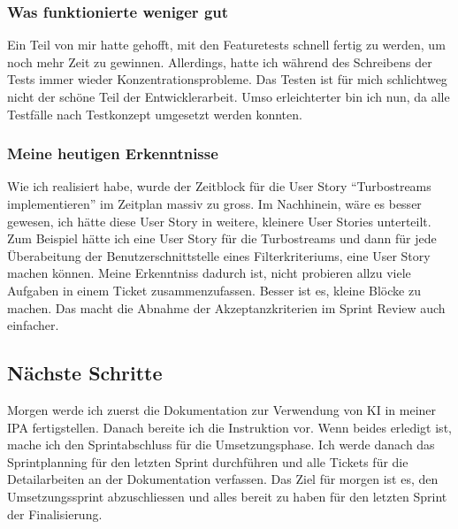 \subsubsection*{Was funktionierte weniger gut}
Ein Teil von mir hatte gehofft, mit den Featuretests schnell fertig zu werden, um noch mehr Zeit zu gewinnen. Allerdings, hatte ich während des Schreibens der Tests
immer wieder Konzentrationsprobleme. Das Testen ist für mich schlichtweg nicht der schöne Teil der Entwicklerarbeit. Umso erleichterter bin ich nun, 
da alle Testfälle nach Testkonzept umgesetzt werden konnten. 

\subsubsection*{Meine heutigen Erkenntnisse}
Wie ich realisiert habe, wurde der Zeitblock für die User Story ``Turbostreams implementieren'' im Zeitplan massiv zu gross. Im Nachhinein, wäre es 
besser gewesen, ich hätte diese User Story in weitere, kleinere User Stories unterteilt. Zum Beispiel hätte ich 
eine User Story für die Turbostreams und dann für jede Überabeitung der Benutzerschnittstelle eines Filterkriteriums, eine User Story machen können.
Meine Erkenntniss dadurch ist, nicht probieren allzu viele Aufgaben in einem Ticket zusammenzufassen. Besser ist es, kleine Blöcke zu machen.
Das macht die Abnahme der Akzeptanzkriterien im Sprint Review auch einfacher.

\subsection*{Nächste Schritte}
Morgen werde ich zuerst die Dokumentation zur Verwendung von KI in meiner IPA fertigstellen.
Danach bereite ich die Instruktion vor. Wenn beides erledigt ist, mache ich den Sprintabschluss für die Umsetzungsphase. 
Ich werde danach das Sprintplanning für den letzten Sprint durchführen und alle Tickets für die Detailarbeiten an der Dokumentation verfassen.
Das Ziel für morgen ist es, den Umsetzungssprint abzuschliessen und alles bereit zu haben für den letzten Sprint der Finalisierung.

\pagebreak
